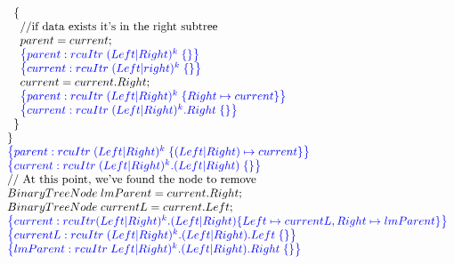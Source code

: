 \[\begin{array}{@{}l@{}}
        \;\;\;\;\{\\
            \;\;\;\;\;\;\text{//if data exists it's in the right subtree}\\
            \;\;\;\;\;\;parent = current; \\
            \;\;\;\;\;\;\specline{parent:rcuItr\; (Left|Right)^{k} \; \{ \} }\\
            \;\;\;\;\;\;\specline{current:rcuItr\; (Left|right)^{k} \; \{ \} }\\
            \;\;\;\;\;\;current = current.Right; \\
            \;\;\;\;\;\;\specline{parent:rcuItr\; (Left|Right)^{k} \; \{ Right\mapsto current\} }\\
            \;\;\;\;\;\;\specline{current:rcuItr\; (Left|Right)^{k}.Right \; \{ \} }\\
        \;\;\;\;\}\\
    \;\;\} \\
    \;\;\specline{parent:rcuItr\; (Left|Right)^{k} \; \{(Left|Right)\mapsto current\} }\\
    \;\;\specline{current:rcuItr\; (Left|Right)^{k}.(Left|Right) \; \{ \} }\\
    \;\;\text{// At this point, we've found the node to remove}\\
    \;\;BinaryTreeNode \;lmParent = current.Right;\\
    \;\;BinaryTreeNode \;currentL = current.Left;\\
    \;\;\specline{current:rcuItr (Left|Right)^{k}.(Left|Right) \{ Left \mapsto currentL, Right \mapsto lmParent\} }\\
    \;\;\specline{currentL:rcuItr\; (Left|Right)^{k}.(Left|Right).Left \; \{\} }\\
     \;\;\specline{lmParent:rcuItr\; Left|Right)^{k}.(Left|Right).Right \; \{ \} }\\
    
\end{array}
\]

